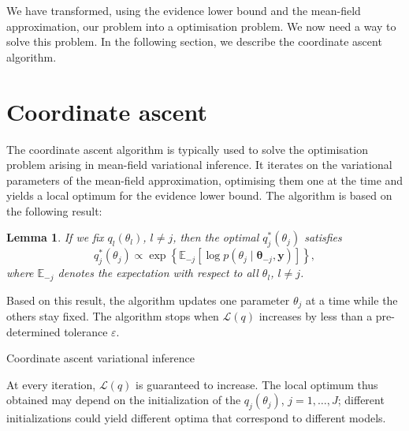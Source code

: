\documentclass[a4paper, 11pt]{report}
\numberwithin{equation}{chapter}
\newtheorem{lemma}{Lemma}[chapter]
\begin{document}
We have transformed, using the evidence lower bound and the mean-field approximation, our problem into a optimisation problem. We now need a way to solve this problem. In the following section, we describe the coordinate ascent algorithm.
\section{Coordinate ascent}
The coordinate ascent algorithm is typically used to solve the optimisation problem arising in mean-field variational inference. It iterates on the variational parameters of the mean-field approximation, optimising them one at the time and yields a local optimum for the evidence lower bound. The algorithm is based on the following result:
\begin{lemma}

If we fix $q_l(\theta_l)$, $l\neq j$, then the optimal $q^*_j(\theta_j)$ satisfies
\begin{equation*}
q^*_j(\theta_j) \propto \exp\left\lbrace\mathbb{E}_{-j}\left[\log p(\theta_j \mid \boldsymbol{\theta}_{-j}, \boldsymbol{y})\right]\right\rbrace,
\end{equation*}
where $\mathbb{E}_{-j}$ denotes the expectation with respect to all $\theta_l$, $l \neq j$.
\end{lemma}

Based on this result, the algorithm updates one parameter $\theta_j$ at a time while the others stay fixed. The algorithm stops when $\mathcal{L}(q)$ increases by less than a pre-determined tolerance $\varepsilon$.

\begin{algorithm}
\BlankLine
{}
\BlankLine
{}
\BlankLine
{}
\caption{\label{alg:CAVI}Coordinate ascent variational inference}
\end{algorithm}
At every iteration, $\mathcal{L}(q)$ is guaranteed to increase. The local optimum thus obtained may depend on the initialization of the $q_j(\theta_j)$, $j=1,\ldots,J$; different initializations could yield different optima that correspond to different models.
\end{document}
